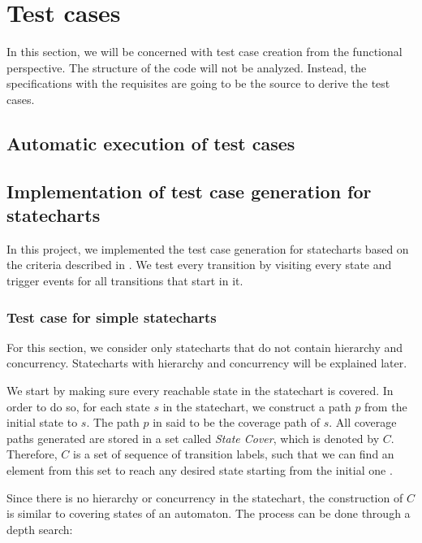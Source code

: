 \chapter{Test cases}
\label{cap:testgen}

In this section, we will be concerned with test case creation from the functional perspective. The structure of the code will not be analyzed. Instead, the specifications with the requisites are going to be the source to derive the test cases.





\section{Automatic execution of test cases}

\section{Implementation of test case generation for statecharts}
\label{implementTestGen}

In this project, we implemented the test case generation for statecharts based on the criteria described in \cite{bogdanov}. We test every transition by visiting every state and trigger events for all transitions that start in it. 

\subsection{Test case for simple statecharts}

For this section, we consider only statecharts that do not contain hierarchy and concurrency. Statecharts with hierarchy and concurrency will be explained later.


We start by making sure every reachable state in the statechart is covered. In order to do so, for each state $s$ in the statechart, we construct a path $p$ from the initial state to $s$. The path $p$ in said to be the coverage path of $s$. All coverage paths generated are stored in a set called \textit{State Cover}, which is denoted by $C$. Therefore, $C$ is a set of sequence of transition labels, such that we can find an element from this set to reach any desired state starting from the initial one \cite{bogdanov}.

Since there is no hierarchy or concurrency in the statechart, the construction of $C$ is similar to covering states of an automaton. The process can be done through a depth search:

